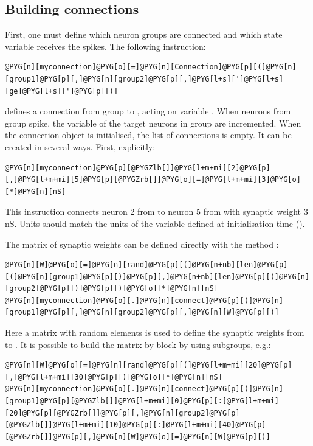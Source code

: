 \documentclass[letterpaper,10pt,english]{manual}
\begin{document}
\subsection{Building connections}

First, one must define which neuron groups are connected and which state variable receives the spikes.
The following instruction:

\begin{Verbatim}[commandchars=@\[\]]
@PYG[n][myconnection]@PYG[o][=]@PYG[n][Connection]@PYG[p][(]@PYG[n][group1]@PYG[p][,]@PYG[n][group2]@PYG[p][,]@PYG[l+s][']@PYG[l+s][ge]@PYG[l+s][']@PYG[p][)]
\end{Verbatim}

defines a connection from group  to , acting on variable . When
neurons from group  spike, the variable  of the target neurons in group
 are incremented. When the connection object is initialised, the list of connections
is empty. It can be created in several ways. First, explicitly:

\begin{Verbatim}[commandchars=@\[\]]
@PYG[n][myconnection]@PYG[p][@PYGZlb[]]@PYG[l+m+mi][2]@PYG[p][,]@PYG[l+m+mi][5]@PYG[p][@PYGZrb[]]@PYG[o][=]@PYG[l+m+mi][3]@PYG[o][*]@PYG[n][nS]
\end{Verbatim}

This instruction connects neuron 2 from  to neuron 5 from  with synaptic weight
3 nS. Units should match the units of the variable defined at initialisation time ().

The matrix of synaptic weights can be defined directly with the method :

\begin{Verbatim}[commandchars=@\[\]]
@PYG[n][W]@PYG[o][=]@PYG[n][rand]@PYG[p][(]@PYG[n+nb][len]@PYG[p][(]@PYG[n][group1]@PYG[p][)]@PYG[p][,]@PYG[n+nb][len]@PYG[p][(]@PYG[n][group2]@PYG[p][)]@PYG[p][)]@PYG[o][*]@PYG[n][nS]
@PYG[n][myconnection]@PYG[o][.]@PYG[n][connect]@PYG[p][(]@PYG[n][group1]@PYG[p][,]@PYG[n][group2]@PYG[p][,]@PYG[n][W]@PYG[p][)]
\end{Verbatim}

Here a matrix with random elements is used to define the synaptic weights from 
to . It is possible to build the matrix by block by using subgroups, e.g.:

\begin{Verbatim}[commandchars=@\[\]]
@PYG[n][W]@PYG[o][=]@PYG[n][rand]@PYG[p][(]@PYG[l+m+mi][20]@PYG[p][,]@PYG[l+m+mi][30]@PYG[p][)]@PYG[o][*]@PYG[n][nS]
@PYG[n][myconnection]@PYG[o][.]@PYG[n][connect]@PYG[p][(]@PYG[n][group1]@PYG[p][@PYGZlb[]]@PYG[l+m+mi][0]@PYG[p][:]@PYG[l+m+mi][20]@PYG[p][@PYGZrb[]]@PYG[p][,]@PYG[n][group2]@PYG[p][@PYGZlb[]]@PYG[l+m+mi][10]@PYG[p][:]@PYG[l+m+mi][40]@PYG[p][@PYGZrb[]]@PYG[p][,]@PYG[n][W]@PYG[o][=]@PYG[n][W]@PYG[p][)]
\end{Verbatim}
\end{document}
